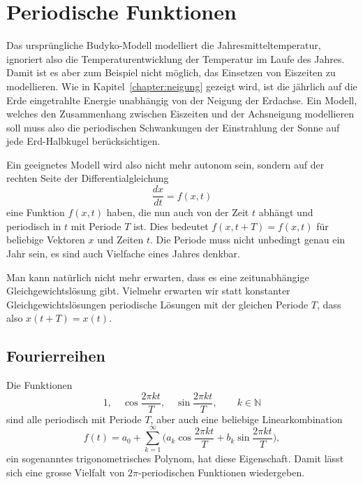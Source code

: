 %
%
%
\section{Periodische Funktionen}
Das ursprüngliche Budyko-Modell modelliert die Jahresmitteltemperatur,
ignoriert also die Temperaturentwicklung der Temperatur im Laufe des
Jahres.
Damit ist es aber zum Beispiel nicht möglich, das Einsetzen von
Eiszeiten zu modellieren.
Wie in Kapitel~\ref{chapter:neigung} gezeigt wird, ist die jährlich
auf die Erde eingetrahlte Energie unabhängig von der Neigung der
Erdachse.
Ein Modell, welches den Zusammenhang zwischen Eiszeiten und der
Achsneigung modellieren soll muss also die periodischen Schwankungen
der Einstrahlung der Sonne auf jede Erd-Halbkugel berücksichtigen.

Ein geeignetes Modell wird also nicht mehr autonom sein, sondern auf der
rechten Seite der Differentialgleichung
\[
\frac{dx}{dt} = f(x,t)
\]
eine Funktion $f(x,t)$ haben, die nun auch von der Zeit $t$ abhängt
und periodisch in $t$ mit Periode $T$ ist.
Dies bedeutet $f(x,t+T)=f(x,t)$ für beliebige Vektoren $x$ und 
Zeiten $t$.
Die Periode muss nicht unbedingt genau ein Jahr sein, es sind auch
Vielfache eines Jahres denkbar.

Man kann natürlich nicht mehr erwarten, dass es eine zeitunabhängige
Gleichgewichtslösung gibt.
Vielmehr erwarten wir statt konstanter Gleichgewichtslösungen 
periodische Lösungen mit der gleichen Periode $T$, dass also
$x(t+T)=x(t)$.

\subsection{Fourierreihen}
Die Funktionen
\begin{equation}
1,\quad
\cos \frac{2\pi kt}{T},\quad
\sin \frac{2\pi kt}{T},\qquad k\in \mathbb N
\label{skript:periodisch:fourierbasis}
\end{equation}
sind alle periodisch mit Periode $T$, aber auch eine beliebige
Linearkombination
\begin{equation}
f(t)
=
a_0  +\sum_{k=1}^\infty\biggl(
a_k \cos \frac{2\pi kt}{T} + b_k\sin\frac{2\pi kt}{T}
\biggr),
\label{skript:periodisch:fourierreihe}
\end{equation}
ein sogenanntes trigonometrisches Polynom, hat diese Eigenschaft.
Damit lässt sich eine grosse Vielfalt von $2\pi$-periodischen
Funktionen wiedergeben.

